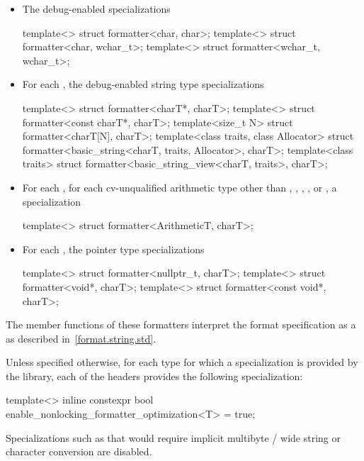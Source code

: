 \begin{itemize}
\item
{}%
The debug-enabled specializations
\begin{codeblock}
template<> struct formatter<char, char>;
template<> struct formatter<char, wchar_t>;
template<> struct formatter<wchar_t, wchar_t>;
\end{codeblock}

\item
{}%
For each ,
the debug-enabled string type specializations
\begin{codeblock}
template<> struct formatter<charT*, charT>;
template<> struct formatter<const charT*, charT>;
template<size_t N> struct formatter<charT[N], charT>;
template<class traits, class Allocator>
  struct formatter<basic_string<charT, traits, Allocator>, charT>;
template<class traits>
  struct formatter<basic_string_view<charT, traits>, charT>;
\end{codeblock}

\item
{}%
For each ,
for each cv-unqualified arithmetic type 
other than
,
,
,
, or
,
a specialization
\begin{codeblock}
template<> struct formatter<ArithmeticT, charT>;
\end{codeblock}

\item
{}%
%
For each ,
the pointer type specializations
\begin{codeblock}
template<> struct formatter<nullptr_t, charT>;
template<> struct formatter<void*, charT>;
template<> struct formatter<const void*, charT>;
\end{codeblock}
\end{itemize}
The  member functions of these formatters
interpret the format specification
as a 
as described in~\ref{format.string.std}.

\pnum
Unless specified otherwise, for each type  for which
a  specialization is provided by the library,
each of the headers provides the following specialization:
\begin{codeblock}
template<> inline constexpr bool enable_nonlocking_formatter_optimization<T> = true;
\end{codeblock}
\begin{note}
Specializations such as 
that would require implicit
multibyte / wide string or character conversion are disabled.
\end{note}

